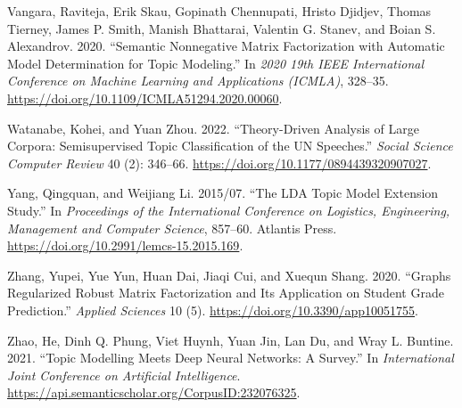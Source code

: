 \documentclass[
]{article}
\newlength{\cslhangindent}
\newlength{\cslentryspacingunit} %
\newenvironment{CSLReferences}[2] %
 {%
  \setlength{\parindent}{0pt}
  \ifodd #1
  \let\oldpar\par
  \def\par{\hangindent=\cslhangindent\oldpar}
  \fi
  \setlength{\parskip}{#2\cslentryspacingunit}
 }%
 {}
\begin{document}
\begin{CSLReferences}{1}{0}
\leavevmode{}%
Vangara, Raviteja, Erik Skau, Gopinath Chennupati, Hristo Djidjev, Thomas Tierney, James P. Smith, Manish Bhattarai, Valentin G. Stanev, and Boian S. Alexandrov. 2020. {``Semantic Nonnegative Matrix Factorization with Automatic Model Determination for Topic Modeling.''} In \emph{2020 19th IEEE International Conference on Machine Learning and Applications (ICMLA)}, 328--35. \url{https://doi.org/10.1109/ICMLA51294.2020.00060}.

\leavevmode{}%
Watanabe, Kohei, and Yuan Zhou. 2022. {``Theory-Driven Analysis of Large Corpora: Semisupervised Topic Classification of the UN Speeches.''} \emph{Social Science Computer Review} 40 (2): 346--66. \url{https://doi.org/10.1177/0894439320907027}.

\leavevmode{}%
Yang, Qingquan, and Weijiang Li. 2015/07. {``The LDA Topic Model Extension Study.''} In \emph{Proceedings of the International Conference on Logistics, Engineering, Management and Computer Science}, 857--60. Atlantis Press. \url{https://doi.org/10.2991/lemcs-15.2015.169}.

\leavevmode{}%
Zhang, Yupei, Yue Yun, Huan Dai, Jiaqi Cui, and Xuequn Shang. 2020. {``Graphs Regularized Robust Matrix Factorization and Its Application on Student Grade Prediction.''} \emph{Applied Sciences} 10 (5). \url{https://doi.org/10.3390/app10051755}.

\leavevmode{}%
Zhao, He, Dinh Q. Phung, Viet Huynh, Yuan Jin, Lan Du, and Wray L. Buntine. 2021. {``Topic Modelling Meets Deep Neural Networks: A Survey.''} In \emph{International Joint Conference on Artificial Intelligence}. \url{https://api.semanticscholar.org/CorpusID:232076325}.

\end{CSLReferences}
\end{document}
